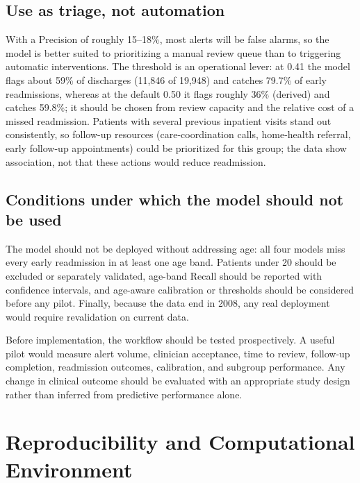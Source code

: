 \documentclass[10pt,a4paper]{article}
\begin{document}
\subsection{Use as triage, not automation}

With a Precision of roughly 15--18\%, most alerts will be false alarms, so the model is better suited to prioritizing a manual review queue than to triggering automatic interventions. The threshold is an operational lever: at 0.41 the model flags about 59\% of discharges (11,846 of 19,948) and catches 79.7\% of early readmissions, whereas at the default 0.50 it flags roughly 36\% (derived) and catches 59.8\%; it should be chosen from review capacity and the relative cost of a missed readmission. Patients with several previous inpatient visits stand out consistently, so follow-up resources (care-coordination calls, home-health referral, early follow-up appointments) could be prioritized for this group; the data show association, not that these actions would reduce readmission.

\subsection{Conditions under which the model should not be used}

The model should not be deployed without addressing age: all four models miss every early readmission in at least one age band. Patients under 20 should be excluded or separately validated, age-band Recall should be reported with confidence intervals, and age-aware calibration or thresholds should be considered before any pilot. Finally, because the data end in 2008, any real deployment would require revalidation on current data.

Before implementation, the workflow should be tested prospectively. A useful pilot would measure alert volume, clinician acceptance, time to review, follow-up completion, readmission outcomes, calibration, and subgroup performance. Any change in clinical outcome should be evaluated with an appropriate study design rather than inferred from predictive performance alone.

\section{Reproducibility and Computational Environment}
\end{document}
